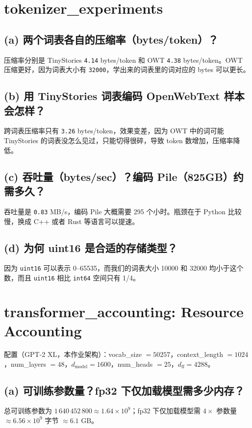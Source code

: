 \documentclass[12pt]{ctexart}
\begin{document}
\section{tokenizer\_experiments}

\subsection{(a) 两个词表各自的压缩率（bytes/token）？}
压缩率分别是 TinyStories \texttt{4.14} bytes/token 和 OWT \texttt{4.38} bytes/token。OWT 压缩更好，因为词表大小有 \texttt{32000}，学出来的词表里的词对应的 bytes 可以更长。

\subsection{(b) 用 TinyStories 词表编码 OpenWebText 样本会怎样？}
跨词表压缩率只有 \texttt{3.26} bytes/token，效果变差，因为 OWT 中的词可能 TinyStories 的词表没怎么见过，只能切得很碎，导致 token 数增加，压缩率降低。

\subsection{(c) 吞吐量（bytes/sec）？编码 Pile（825GB）约需多久？}
吞吐量是 \texttt{0.83} MB/s，编码 Pile 大概需要 295 个小时。瓶颈在于 Python 比较慢，换成 C++ 或者 Rust 等语言可以提速。

\subsection{(d) 为何 uint16 是合适的存储类型？}
因为 \texttt{uint16} 可以表示 0--65535，而我们的词表大小 10000 和 32000 均小于这个数，而且 \texttt{uint16} 相比 \texttt{int64} 空间只有 1/4。

\section{transformer\_accounting: Resource Accounting}

配置（GPT-2 XL，本作业架构）：vocab\_size $=50257$，context\_length $=1024$，num\_layers $=48$，$d_{\text{model}}=1600$，num\_heads $=25$，$d_{\text{ff}}=4288$。

\subsection{(a) 可训练参数量？fp32 下仅加载模型需多少内存？}
总可训练参数为 $1\,640\,452\,800\approx1.64\times10^9$；fp32 下仅加载模型需 $4\times$ 参数量 $\approx6.56\times10^9$ 字节 $\approx6.1$ GB。
\end{document}

